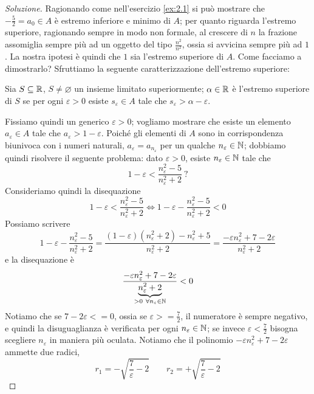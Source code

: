 \begin{proof}[Soluzione]
    Ragionando come nell'esercizio \ref{ex:2.1} si può mostrare che $-\frac{5}{2} = a_0\in A$ è estremo inferiore e minimo di $A$; per quanto riguarda l'estremo superiore, ragionando sempre in modo non formale, al crescere di $n$ la frazione assomiglia sempre più ad un oggetto del tipo $\frac{n^2}{n^2}$, ossia si avvicina sempre più ad $1$. La nostra ipotesi è quindi che $1$ sia l'estremo superiore di $A$. Come facciamo a dimostrarlo? Sfruttiamo la seguente caratterizzazione dell'estremo superiore:
    \begin{tcolorbox}
        \begin{theorem}
            \label{th:2.2}
            Sia $S\subseteq \amsbb{R}$, $S\ne \varnothing$ un insieme limitato superiormente; $\alpha\in \amsbb{R}$ è l'estremo superiore di $S$ se per ogni $\varepsilon>0$ esiste $s_{\varepsilon}\in A$ tale che $s_\varepsilon>\alpha-\varepsilon$.
        \end{theorem}
    \end{tcolorbox}
    Fissiamo quindi un generico $\varepsilon>0$; vogliamo mostrare che esiste un elemento $a_\varepsilon\in A$ tale che $a_\varepsilon>1-\varepsilon$. Poiché gli elementi di $A$ sono in corrispondenza biunivoca con i numeri naturali, $a_\varepsilon = a_{n_\varepsilon}$ per un qualche $n_\varepsilon \in \amsbb{N}$; dobbiamo quindi risolvere il seguente problema: dato $\varepsilon>0$, esiste $n_\varepsilon\in\amsbb{N}$ tale che
    \[
    1-\varepsilon<\frac{n_\varepsilon^2-5}{n_\varepsilon^2+2} \ \text{?}
    \]
    Consideriamo quindi la disequazione
    \[
    1-\varepsilon < \frac{n_\varepsilon^2-5}{n_\varepsilon^2+2} \iff 1-\varepsilon - \frac{n_\varepsilon^2-5}{n_\varepsilon^2+2} <0
    \]
    Possiamo scrivere
    \[
    1-\varepsilon-\frac{n_\varepsilon^2-5}{n_\varepsilon^2+2} = \frac{(1-\varepsilon)(n_\varepsilon^2+2)-n_\varepsilon^2+5}{n_\varepsilon^2+2} = \frac{-\varepsilon n_\varepsilon^2+7-2\varepsilon}{n_\varepsilon^2+2}
    \]
    e la disequazione è
    \[
    \frac{-\varepsilon n_\varepsilon^2 + 7 -2\varepsilon}{\underbrace{n_\varepsilon^2+2}_{>0 \ \forall n_\varepsilon \in \amsbb{N}}}<0
    \]
    Notiamo che se $7-2\varepsilon<=0$, ossia se $\varepsilon>=\frac{7}{2}$, il numeratore è sempre negativo, e quindi la disuguaglianza è verificata per ogni $n_\varepsilon\in\amsbb{N}$; se invece $\varepsilon<\frac{7}{2}$ bisogna scegliere $n_\varepsilon$ in maniera più oculata. Notiamo che il polinomio $-\varepsilon n_\varepsilon^2 +7-2\varepsilon$ ammette due radici,
    \[
    r_1 = -\sqrt{\frac{7}{\varepsilon}-2} \qquad r_2 = +\sqrt{\frac{7}{\varepsilon}-2}
\]
\end{proof}
